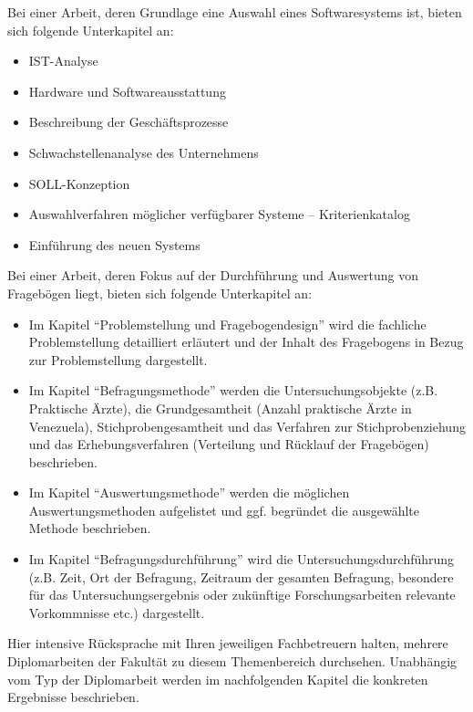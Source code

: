Bei einer Arbeit, deren Grundlage eine Auswahl eines Softwaresystems ist, bieten sich folgende Unterkapitel an:
\begin{itemize}
	\item IST-Analyse
	\item Hardware und Softwareausstattung
	\item Beschreibung der Geschäftsprozesse
	\item Schwachstellenanalyse des Unternehmens
	\item SOLL-Konzeption
	\item Auswahlverfahren möglicher verfügbarer Systeme -- Kriterienkatalog
	\item Einführung des neuen Systems
\end{itemize}

Bei einer Arbeit, deren Fokus auf der Durchführung und Auswertung von Fragebögen liegt, bieten sich folgende Unterkapitel an:
\begin{itemize}
	\item Im Kapitel \enquote{Problemstellung und Fragebogendesign} wird die fachliche Problemstellung detailliert erläutert und der Inhalt des Fragebogens in Bezug zur Problemstellung dargestellt.
	\item Im Kapitel \enquote{Befragungsmethode} werden die Untersuchungsobjekte (z.B. Praktische Ärzte), die Grundgesamtheit (Anzahl praktische Ärzte in Venezuela), Stichprobengesamtheit und das Verfahren zur Stichprobenziehung und das Erhebungsverfahren (Verteilung und Rücklauf der Fragebögen) beschrieben.
	\item Im Kapitel \enquote{Auswertungsmethode} werden die möglichen Auswertungsmethoden aufgelistet und ggf. begründet die ausgewählte Methode beschrieben.
	\item Im Kapitel \enquote{Befragungsdurchführung} wird die Untersuchungsdurchführung (z.B. Zeit, Ort der Befragung, Zeitraum der gesamten Befragung, besondere für das Untersuchungsergebnis oder zukünftige Forschungsarbeiten relevante Vorkommnisse etc.) dargestellt.
\end{itemize}

Hier intensive Rücksprache mit Ihren jeweiligen Fachbetreuern halten, mehrere Diplomarbeiten der Fakultät zu diesem Themenbereich durchsehen. Unabhängig vom Typ der Diplomarbeit werden im nachfolgenden Kapitel die konkreten Ergebnisse beschrieben.